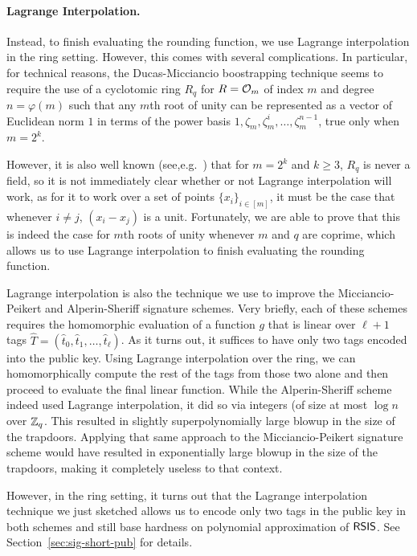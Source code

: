 \paragraph{Lagrange Interpolation.} 
Instead, to finish evaluating the rounding function, we use Lagrange interpolation in the ring setting. However, this comes with several complications. In particular, for technical reasons, the Ducas-Micciancio boostrapping technique seems to require the use of a cyclotomic ring $R_q$ for $R=\mathcal{O}_m$ of index $m$ and degree $n=\varphi(m)$ such that any $m$th root of unity can be represented as a vector of Euclidean norm $1$ in terms of the power basis $1,\zeta_m, \zeta_m^{i}, \ldots, \zeta_{m}^{n-1}$, true only when $m=2^{k}$. 

However, it is also well known (see,e.g.~\cite[Theorem 2.47]{FiniteFieldsIntro}) that for $m=2^{k}$ and $k\geq 3$, $R_q$ is never a field, so it is not immediately clear whether or not Lagrange interpolation will work, as for it to work over a set of points $\{x_i\}_{i \in [m]}$, it must be the case that whenever $i \neq j$, $(x_i - x_j)$ is a unit. Fortunately, we are able to prove that this is indeed the case for $m$th roots of unity whenever $m$ and $q$ are coprime, which allows us to use Lagrange interpolation to finish evaluating the rounding function. 

Lagrange interpolation is also the technique we use to improve the Micciancio-Peikert and Alperin-Sheriff signature schemes. Very briefly, each of these schemes requires the homomorphic evaluation of a function $g$ 
that is linear over $\ell+1$
tags $\hat{T}=(\hat{t}_0,\hat{t}_1, \ldots, \hat{t}_{\ell})$. As it turns out, it suffices to have only two tags encoded into the public key. Using Lagrange interpolation over the ring, we can homomorphically compute the rest of the tags from those two alone and then proceed to evaluate the final linear function.
While the Alperin-Sheriff scheme indeed used Lagrange interpolation, it did so via integers (of size at most $\log{n}$ over $\mathbb{Z}_q$. This resulted in slightly superpolynomially large blowup in the size of the trapdoors. Applying that same approach to the Micciancio-Peikert signature scheme would have resulted in exponentially large blowup in the size of the trapdoors, making it completely useless to that context. 

However, in the ring setting, it turns out that the Lagrange interpolation technique we just sketched allows us to encode only two tags in the public key in both schemes and still base hardness on polynomial approximation of $\mathsf{RSIS}$. See Section~\ref{sec:sig-short-pub} for details.


